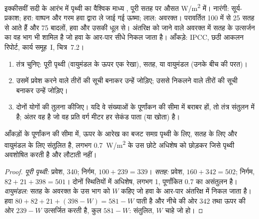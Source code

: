 \begin{omfigure}
{\small इक्कीसवीं सदी के आरंभ में पृथ्वी का वैश्विक माध्य , पूरी सतह पर औसत
\unit{W/m^2} में। नारंगी:
सूर्य-प्रकाश; हरा: वाष्पन और गरम हवा द्वारा ले जाई गई ऊष्मा; लाल: अवरक्त।
परावर्तित 100 में से 25 सतह से आते हैं और 75 बादलों, हवा
और उसकी धूल से। अंतरिक्ष को जाने वाले अवरक्त में सतह के उत्सर्जन का वह भाग भी शामिल है
जो हवा के आर-पार सीधे निकल जाता है। आँकड़े: IPCC, छठी आकलन
रिपोर्ट, कार्य समूह~I, चित्र~7.2।}
\end{omfigure}

\begin{method}[ऊर्जा-बजट आरेख पढ़ना]\label{met:g10:earth-energy-budget:reading}
\begin{enumerate}
  \item तंत्र चुनिए: पूरी पृथ्वी (वायुमंडल के ऊपर एक रेखा),
        सतह, या वायुमंडल (उनके बीच की परत)।
  \item उसमें प्रवेश करने वाले तीरों की सूची बनाकर उन्हें जोड़िए; उससे निकलने वाले तीरों की
        सूची बनाकर उन्हें जोड़िए।
  \item दोनों योगों की तुलना कीजिए। यदि वे संख्याओं के पूर्णांकन की सीमा में बराबर हों, तो
        तंत्र संतुलन में है; अंतर वह है जो वह प्रति वर्ग मीटर हर सेकंड पाता (या
        खोता) है।
\end{enumerate}
\end{method}

\begin{proposition}[बजट संतुलित होता है]\label{prop:g10:earth-energy-budget:balance}
आँकड़ों के पूर्णांकन की सीमा में, ऊपर के आरेख का बजट
समग्र पृथ्वी के लिए, सतह के लिए और वायुमंडल के लिए संतुलित है, लगभग
\qty{0.7}{W/m^2} के उस छोटे अधिशेष को छोड़कर जिसे पृथ्वी अवशोषित करती है और लौटाती
नहीं।
\end{proposition}

\begin{proof}
\emph{पूरी पृथ्वी:} प्रवेश, 340; निर्गम, $100 + 239 = 339$। \emph{सतह:} प्रवेश,
$160 + 342 = 502$; निर्गम, $82 + 21 + 398 = 501$। दोनों स्थितियों में अधिशेष,
लगभग 1, पूर्णांकित 0.7 का असंतुलन है। \emph{वायुमंडल:} सतह के अवरक्त के उस भाग को
$W$ कहिए जो हवा के आर-पार अंतरिक्ष में निकल जाता है। हवा
$80 + 82 + 21 + (398 - W) = 581 - W$ पाती है और नीचे की ओर $342$ तथा
ऊपर की ओर $239 - W$ उत्सर्जित करती है, कुल $581 - W$: संतुलित, $W$ चाहे जो हो।
\end{proof}

